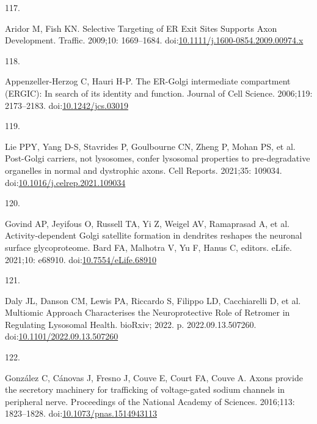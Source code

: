 \documentclass[
  12pt,
  a4paper,
]{book}
\newlength{\cslhangindent}
\newlength{\csllabelwidth}
\newlength{\cslentryspacingunit} %
\newenvironment{CSLReferences}[2] %
 {%
  \setlength{\parindent}{0pt}
  \ifodd #1
  \let\oldpar\par
  \def\par{\hangindent=\cslhangindent\oldpar}
  \fi
  \setlength{\parskip}{#2\cslentryspacingunit}
 }%
 {}
\newcommand{\CSLLeftMargin}[1]{\parbox[t]{\csllabelwidth}{#1}}
\newcommand{\CSLRightInline}[1]{\parbox[t]{\linewidth - \csllabelwidth}{#1}\break}
\begin{document}
\begin{CSLReferences}{0}{0}
\leavevmode{}%
\CSLLeftMargin{117. }%
\CSLRightInline{Aridor M, Fish KN. Selective {Targeting} of {ER Exit Sites Supports Axon Development}. Traffic. 2009;10: 1669--1684. doi:\href{https://doi.org/10.1111/j.1600-0854.2009.00974.x}{10.1111/j.1600-0854.2009.00974.x}}

\leavevmode{}%
\CSLLeftMargin{118. }%
\CSLRightInline{Appenzeller-Herzog C, Hauri H-P. The {ER-Golgi} intermediate compartment ({ERGIC}): In search of its identity and function. Journal of Cell Science. 2006;119: 2173--2183. doi:\href{https://doi.org/10.1242/jcs.03019}{10.1242/jcs.03019}}

\leavevmode{}%
\CSLLeftMargin{119. }%
\CSLRightInline{Lie PPY, Yang D-S, Stavrides P, Goulbourne CN, Zheng P, Mohan PS, et al. Post-{Golgi} carriers, not lysosomes, confer lysosomal properties to pre-degradative organelles in normal and dystrophic axons. Cell Reports. 2021;35: 109034. doi:\href{https://doi.org/10.1016/j.celrep.2021.109034}{10.1016/j.celrep.2021.109034}}

\leavevmode{}%
\CSLLeftMargin{120. }%
\CSLRightInline{Govind AP, Jeyifous O, Russell TA, Yi Z, Weigel AV, Ramaprasad A, et al. Activity-dependent {Golgi} satellite formation in dendrites reshapes the neuronal surface glycoproteome. Bard FA, Malhotra V, Yu F, Hanus C, editors. eLife. 2021;10: e68910. doi:\href{https://doi.org/10.7554/eLife.68910}{10.7554/eLife.68910}}

\leavevmode{}%
\CSLLeftMargin{121. }%
\CSLRightInline{Daly JL, Danson CM, Lewis PA, Riccardo S, Filippo LD, Cacchiarelli D, et al. Multiomic {Approach Characterises} the {Neuroprotective Role} of {Retromer} in {Regulating Lysosomal Health}. {bioRxiv}; 2022. p. 2022.09.13.507260. doi:\href{https://doi.org/10.1101/2022.09.13.507260}{10.1101/2022.09.13.507260}}

\leavevmode{}%
\CSLLeftMargin{122. }%
\CSLRightInline{González C, Cánovas J, Fresno J, Couve E, Court FA, Couve A. Axons provide the secretory machinery for trafficking of voltage-gated sodium channels in peripheral nerve. Proceedings of the National Academy of Sciences. 2016;113: 1823--1828. doi:\href{https://doi.org/10.1073/pnas.1514943113}{10.1073/pnas.1514943113}}


\end{CSLReferences}
\end{document}
